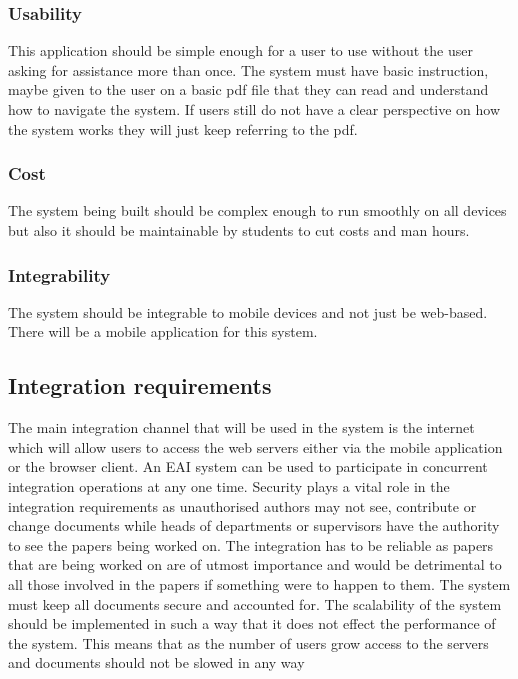 \documentclass[a4paper,12pt]{report}
\begin{document}
\subsubsection{Usability}

This application should be simple enough for a user to use without the user asking for assistance more than once. The system must have basic instruction, maybe given to the user on a basic pdf file that they can read and understand how to navigate the system. If users still do not have a clear perspective on how the system works they will just keep referring to the pdf.

\subsubsection{Cost}

The system being built should be complex enough to run smoothly on all devices but also it should be maintainable by students to cut costs and man hours.

\subsubsection{Integrability}

The system should be integrable to mobile devices and not just be web-based. There will be a mobile application for this system.


\subsection{Integration requirements}

The main integration channel that will be used in the system is the internet which will allow users to access the web servers either via the mobile application or the browser client. An EAI system can be used to participate in concurrent integration operations at any one time.
Security plays a vital role in the integration requirements as unauthorised authors may not see, contribute or change documents while heads of departments or supervisors have the authority to see the papers being worked on.
The integration has to be reliable as papers that are being worked on are of utmost importance and would be detrimental to all those involved in the papers if something were to happen to them. The system must keep all documents secure and accounted for.
The scalability of the system should be implemented in such a way that it does not effect the performance of the system. This means that as the number of users grow access to the servers and documents should not be slowed in any way
\end{document}
